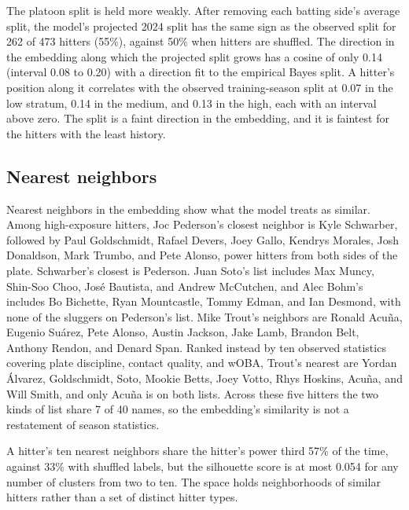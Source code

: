 \documentclass[11pt,letterpaper]{article}
\let\oldsubsection\subsection
\renewcommand\subsection{\FloatBarrier\oldsubsection}
\begin{document}
The platoon split is held more weakly. After removing each batting side's average split, the model's projected 2024 split has the same sign as the observed split for 262 of 473 hitters (55\%), against 50\% when hitters are shuffled. The direction in the embedding along which the projected split grows has a cosine of only 0.14 (interval 0.08 to 0.20) with a direction fit to the empirical Bayes split. A hitter's position along it correlates with the observed training-season split at 0.07 in the low stratum, 0.14 in the medium, and 0.13 in the high, each with an interval above zero. The split is a faint direction in the embedding, and it is faintest for the hitters with the least history.

\subsection{Nearest neighbors}
\label{sec:neighbors}

Nearest neighbors in the embedding show what the model treats as similar. Among high-exposure hitters, Joc Pederson's closest neighbor is Kyle Schwarber, followed by Paul Goldschmidt, Rafael Devers, Joey Gallo, Kendrys Morales, Josh Donaldson, Mark Trumbo, and Pete Alonso, power hitters from both sides of the plate. Schwarber's closest is Pederson. Juan Soto's list includes Max Muncy, Shin-Soo Choo, José Bautista, and Andrew McCutchen, and Alec Bohm's includes Bo Bichette, Ryan Mountcastle, Tommy Edman, and Ian Desmond, with none of the sluggers on Pederson's list. Mike Trout's neighbors are Ronald Acuña, Eugenio Suárez, Pete Alonso, Austin Jackson, Jake Lamb, Brandon Belt, Anthony Rendon, and Denard Span. Ranked instead by ten observed statistics covering plate discipline, contact quality, and wOBA, Trout's nearest are Yordan Álvarez, Goldschmidt, Soto, Mookie Betts, Joey Votto, Rhys Hoskins, Acuña, and Will Smith, and only Acuña is on both lists. Across these five hitters the two kinds of list share 7 of 40 names, so the embedding's similarity is not a restatement of season statistics.

A hitter's ten nearest neighbors share the hitter's power third 57\% of the time, against 33\% with shuffled labels, but the silhouette score is at most 0.054 for any number of clusters from two to ten. The space holds neighborhoods of similar hitters rather than a set of distinct hitter types.
\end{document}
